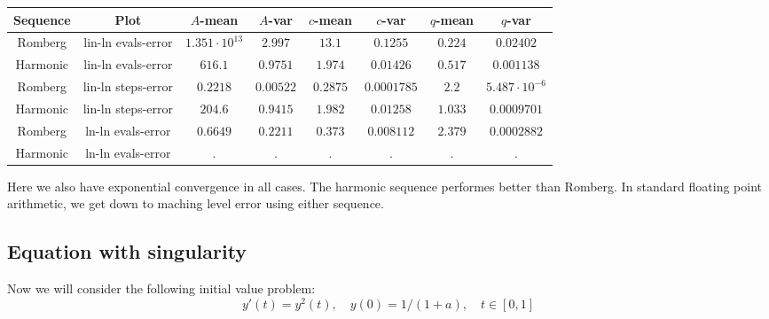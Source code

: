 \begin{table}[H]
    \centering
    \small
     \begin{tabular}{c|c||c|c|c|c|c|c}
Sequence & Plot & \(A\)-mean & \(A\)-var & \(c\)-mean & \(c\)-var & \(q\)-mean & \(q\)-var\\\hline
Romberg & lin-ln evals-error & \(1.351\cdot 10^{13}\) & \(2.997\) & \(13.1\) & \(0.1255\) & \(0.224\) & \(0.02402\) \\
Harmonic & lin-ln evals-error & \(616.1\) & \(0.9751\) & \(1.974\) & \(0.01426\) & \(0.517\) & \(0.001138\) \\
Romberg & lin-ln steps-error & \(0.2218\) & \(0.00522\) & \(0.2875\) & \(0.0001785\) & \(2.2\) & \(5.487\cdot 10^{-6}\) \\
Harmonic & lin-ln steps-error & \(204.6\) & \(0.9415\) & \(1.982\) & \(0.01258\) & \(1.033\) & \(0.0009701\) \\
Romberg & ln-ln evals-error & \(0.6649\) & \(0.2211\) & \(0.373\) & \(0.008112\) & \(2.379\) & \(0.0002882\) \\
Harmonic & ln-ln evals-error & . & . & . & . & . & . \\
    \end{tabular}
    \label{tab:my_label}
\end{table}

Here we also have exponential convergence in all cases. The harmonic sequence performes better than Romberg. In standard floating point arithmetic, we get down to maching level error using either sequence.

\subsection{Equation with singularity}

Now we will consider the following initial value problem:
\begin{equation}\label{46}
y'(t) = y^2(t),\quad y(0) = 1/(1+a), \quad t\in [0,1]
\end{equation}

